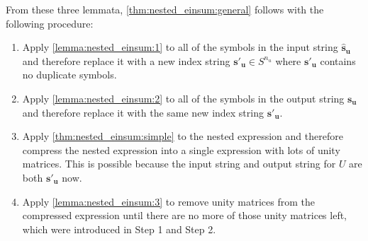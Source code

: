 

From these three lemmata, \cref{thm:nested_einsum:general} follows with the following procedure:
\begin{enumerate}[label={Step \arabic*:}, align=left]
    \item Apply \cref{lemma:nested_einsum:1} to all of the symbols in the input string $\bm{\hat{s}_u}$ and therefore replace it with a new index string $\bm{s'_u} \in S^{n_u}$ where $\bm{s'_u}$ contains no duplicate symbols.
    \item Apply \cref{lemma:nested_einsum:2} to all of the symbols in the output string $\bm{s_u}$ and therefore replace it with the same new index string $\bm{s'_u}$.
    \item Apply \cref{thm:nested_einsum:simple} to the nested expression and therefore compress the nested expression into a single expression with lots of unity matrices.
          This is possible because the input string and output string for $U$ are both $\bm{s'_u}$ now.
    \item Apply \cref{lemma:nested_einsum:3} to remove unity matrices from the compressed expression until there are no more of those unity matrices left, which were introduced in Step 1 and Step 2.
\end{enumerate}

